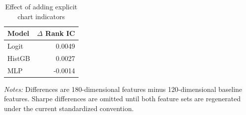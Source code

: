 \begin{table}[htbp]
\centering
\caption{Effect of adding explicit chart indicators}
\label{tab:accessibility_delta}
\begin{tabular}{lr}
\toprule
Model & $\Delta$ Rank IC \\
\midrule
Logit & 0.0049 \\
HistGB & 0.0027 \\
MLP & -0.0014 \\
\bottomrule
\end{tabular}
\begin{minipage}{0.92\linewidth}
\footnotesize
\textit{Notes:} Differences are 180-dimensional features minus 120-dimensional baseline features. Sharpe differences are omitted until both feature sets are regenerated under the current standardized convention.
\end{minipage}
\end{table}
